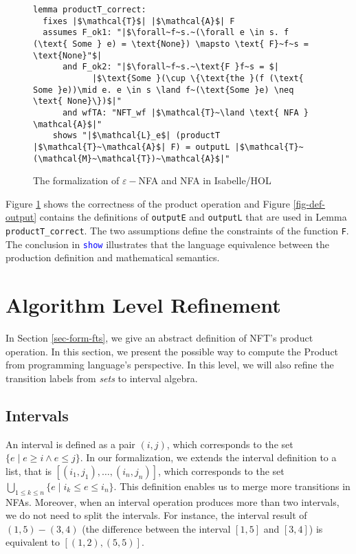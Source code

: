 \documentclass[a4paper,UKenglish,cleveref, autoref, anonymous, thm-restate]{lipics-v2021}
\begin{document}
\begin{figure}[hbt!]
	\begin{lstlisting}
lemma productT_correct:
  fixes |$\mathcal{T}$| |$\mathcal{A}$| F
  assumes F_ok1: "|$\forall~f~s.~(\forall e \in s. f (\text{ Some } e) = \text{None}) \mapsto \text{ F}~f~s = \text{None}"$|
      and F_ok2: "|$\forall~f~s.~\text{F }f~s = $|
            |$\text{Some }(\cup \{\text{the }(f (\text{ Some }e))\mid e. e \in s \land f~(\text{Some }e) \neq \text{ None}\})$|"
      and wfTA: "NFT_wf |$\mathcal{T}~\land \text{ NFA } \mathcal{A}$|"
    shows "|$\mathcal{L}_e$| (productT |$\mathcal{T}~\mathcal{A}$| F) = outputL |$\mathcal{T}~(\mathcal{M}~\mathcal{T})~\mathcal{A}$|"

	\end{lstlisting}
\caption{The formalization of $\varepsilon-$NFA and NFA in Isabelle/HOL}
\label{fig-def-product-correct}
\end{figure}

Figure \ref{fig-def-product-correct} shows the correctness of the product operation and Figure \ref{fig-def-output} contains the definitions of \texttt{outputE} and \texttt{outputL} that are used in Lemma \texttt{productT\_correct}.
The two assumptions define the constraints of the function \texttt{F}.
The conclusion in \textcolor{blue}{\texttt{show}} illustrates 
that the language equivalence between the production definition and mathematical semantics.

\section{Algorithm Level Refinement}
\label{sec_alg_refinement}
In Section \ref{sec-form-fts}, we give an abstract definition of NFT's product operation. In this section, we present the possible way to compute the Product from programming language's perspective.
In this level, we will also refine the transition labels from \emph{sets} to interval algebra.

\subsection{Intervals}
An interval is defined as a pair $(i, j)$, which corresponds to the set $\{e \mid e \geq i \land e \leq j\}$. In our formalization, we extends the interval definition to a list, that is $[(i_1, j_1), \ldots, (i_n, j_n)]$, which corresponds to the set $\bigcup_{1\leq k\leq n}\{e \mid i_k \leq e \leq i_n\}$. This definition enables us to merge more transitions in NFAs. Moreover, when an interval operation produces more than two intervals, we do not need to split the intervals. For instance, the interval result of $(1, 5) - (3, 4)$ (the difference between the interval $[1, 5]$ and $[3, 4]$) is equivalent to $[(1, 2), (5, 5)]$.
\end{document}
